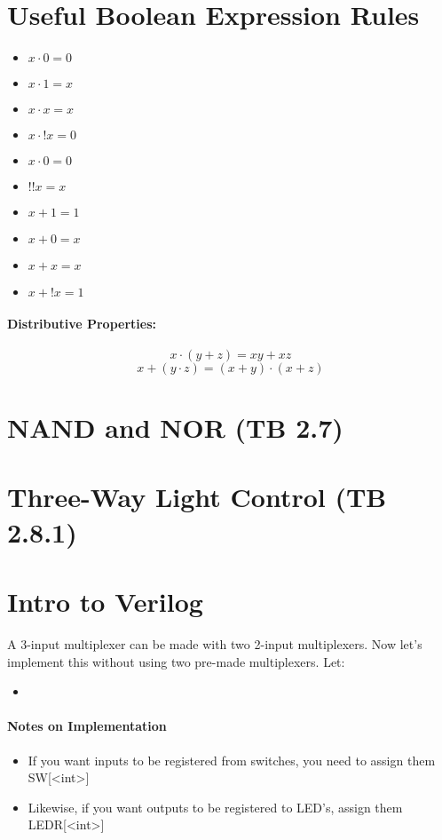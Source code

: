 \documentclass[a4paper,12pt]{report}
\begin{document}
\section{Useful Boolean Expression Rules}
\begin{itemize}
\item $x \cdot 0 = 0$
\item $x \cdot 1 = x$
\item $x \cdot x = x$
\item $x \cdot !x = 0$
\item $x \cdot 0 = 0$
\item $!!x = x$
\item $x + 1 = 1$
\item $x + 0 = x$
\item $x + x = x$
\item $x + !x = 1$
\end{itemize}

\paragraph{Distributive Properties: }
$$x \cdot (y + z) = xy + xz$$
$$x + (y \cdot z) = (x+y) \cdot (x+z)$$



\section{NAND and NOR (TB 2.7)}
\section{Three-Way Light Control (TB 2.8.1)}
\section{Intro to Verilog}
A 3-input multiplexer can be made with two 2-input multiplexers.
Now let's implement this without using two pre-made multiplexers. Let:
\begin{itemize}
\item 
\end{itemize}

\paragraph{Notes on Implementation}
\begin{itemize}
\item If you want inputs to be registered from switches, you need to assign them SW[<int>]
\item Likewise, if you want outputs to be registered to LED's, assign them LEDR[<int>]
\end{itemize}
\end{document}
